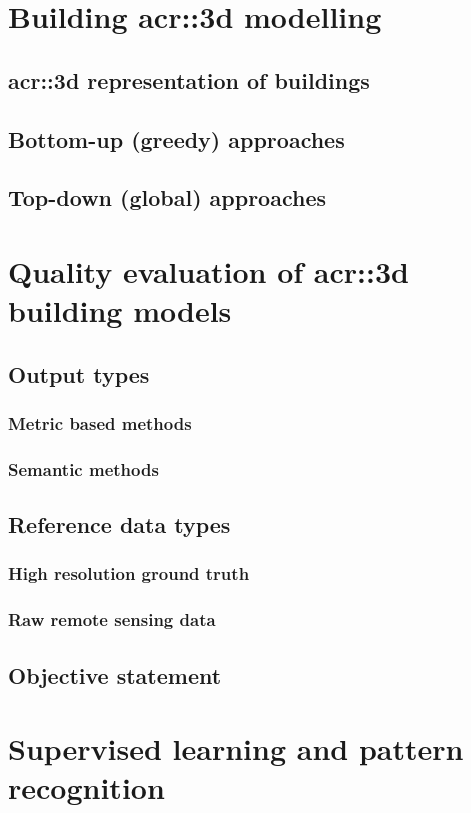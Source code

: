 \minitoc
\section{Building \gls{acr::3d} modelling}
    \subsection{\gls{acr::3d} representation of buildings}
    \subsection{Bottom-up (greedy) approaches}
    \subsection{Top-down (global) approaches}
\section{Quality evaluation of \gls{acr::3d} building models}
    \subsection{Output types}
        \subsubsection{Metric based methods}
        \subsubsection{Semantic methods}
    \subsection{Reference data types}
        \subsubsection{High resolution ground truth}
        \subsubsection{Raw remote sensing data}
    \subsection{Objective statement}
\section{Supervised learning and pattern recognition}
